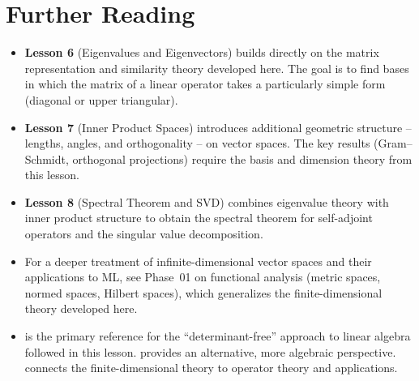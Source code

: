 \documentclass[11pt,a4paper]{article}
\begin{document}
\section{Further Reading}
\label{sec:further_reading}

\begin{itemize}
  \item \textbf{Lesson 6} (Eigenvalues and Eigenvectors) builds directly on
        the matrix representation and similarity theory developed here.
        The goal is to find bases in which the matrix of a linear operator
        takes a particularly simple form (diagonal or upper triangular).

  \item \textbf{Lesson 7} (Inner Product Spaces) introduces additional
        geometric structure -- lengths, angles, and orthogonality -- on
        vector spaces.  The key results (Gram--Schmidt, orthogonal projections)
        require the basis and dimension theory from this lesson.

  \item \textbf{Lesson 8} (Spectral Theorem and SVD) combines eigenvalue
        theory with inner product structure to obtain the spectral theorem
        for self-adjoint operators and the singular value decomposition.

  \item For a deeper treatment of infinite-dimensional vector spaces and
        their applications to ML, see Phase~01 on functional analysis
        (metric spaces, normed spaces, Hilbert spaces), which generalizes
        the finite-dimensional theory developed here.

  \item \citet{axler2015} is the primary reference for the ``determinant-free''
        approach to linear algebra followed in this lesson.
        \citet{hoffman1971} provides an alternative, more algebraic perspective.
        \citet{lax2007} connects the finite-dimensional theory to operator
        theory and applications.
\end{itemize}


\end{document}
